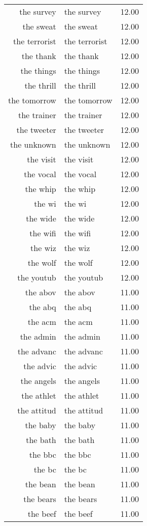 \begin{table}[ht]
\begin{tabular}{rlr}
  the survey & the survey & 12.00 \\ 
  the sweat & the sweat & 12.00 \\ 
  the terrorist & the terrorist & 12.00 \\ 
  the thank & the thank & 12.00 \\ 
  the things & the things & 12.00 \\ 
  the thrill & the thrill & 12.00 \\ 
  the tomorrow & the tomorrow & 12.00 \\ 
  the trainer & the trainer & 12.00 \\ 
  the tweeter & the tweeter & 12.00 \\ 
  the unknown & the unknown & 12.00 \\ 
  the visit & the visit & 12.00 \\ 
  the vocal & the vocal & 12.00 \\ 
  the whip & the whip & 12.00 \\ 
  the wi & the wi & 12.00 \\ 
  the wide & the wide & 12.00 \\ 
  the wifi & the wifi & 12.00 \\ 
  the wiz & the wiz & 12.00 \\ 
  the wolf & the wolf & 12.00 \\ 
  the youtub & the youtub & 12.00 \\ 
  the abov & the abov & 11.00 \\ 
  the abq & the abq & 11.00 \\ 
  the acm & the acm & 11.00 \\ 
  the admin & the admin & 11.00 \\ 
  the advanc & the advanc & 11.00 \\ 
  the advic & the advic & 11.00 \\ 
  the angels & the angels & 11.00 \\ 
  the athlet & the athlet & 11.00 \\ 
  the attitud & the attitud & 11.00 \\ 
  the baby & the baby & 11.00 \\ 
  the bath & the bath & 11.00 \\ 
  the bbc & the bbc & 11.00 \\ 
  the bc & the bc & 11.00 \\ 
  the bean & the bean & 11.00 \\ 
  the bears & the bears & 11.00 \\ 
  the beef & the beef & 11.00 \\ 

\end{tabular}
\end{table}
